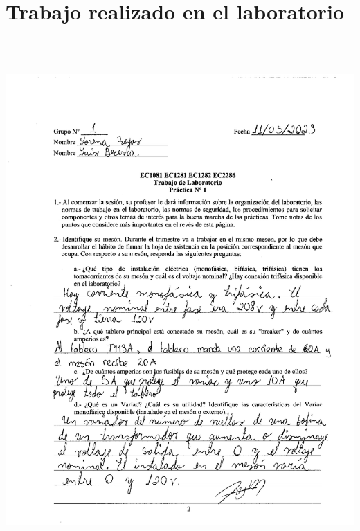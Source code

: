 \documentclass[12pt]{article}
\begin{document}
	\section{Trabajo realizado en el laboratorio}
	\includegraphics[width=15cm,height=20cm]{anexo1}\\
	
\end{document}
